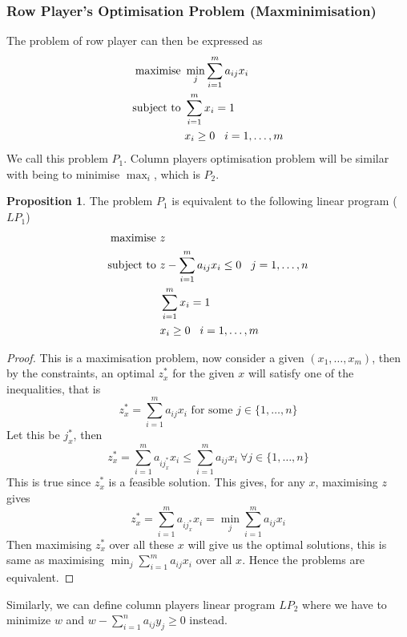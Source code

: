 \documentclass{article}
\theoremstyle{definition}
\newtheorem{prop}{Proposition}[section]
\begin{document}
\subsubsection*{Row Player's Optimisation Problem (Maxminimisation)}
The problem of row player can then be expressed as
\begin{align*}
\text{maximise } & \min_j \sum_{i=1}^m a_{ij}x_i\\
\text{subject to } & \sum_{i=1}^m x_i = 1\\
& x_i\geq 0 \hspace{3mm} i = 1,\dots,m
\end{align*}
We call this problem $P_1$. Column players optimisation problem will be similar with being to minimise $\max_i$, which is $P_2$.
\begin{prop}
The problem $P_1$ is equivalent to the following linear program ($LP_1$)
\begin{align*}
\text{maximise } & z\\
\text{subject to } & z - \sum_{i=1}^m a_{ij}x_i\leq 0 \hspace{3mm} j = 1,\dots,n\\
& \sum_{i=1}^m x_i = 1\\
& x_i\geq 0 \hspace{3mm} i = 1,\dots,m
\end{align*}
\end{prop}
\begin{proof}
This is a maximisation problem, now consider a given $(x_1,\dots,x_m)$, then by the constraints, an optimal $z_x^*$ for the given $x$ will satisfy one of the inequalities, that is $$z^*_x = \sum_{i=1}^m a_{ij}x_i \text{ for some } j\in\{1,\dots,n\}$$ Let this be $j^*_x$, then $$z^*_x = \sum_{i=1}^m a_{ij^*_x} x_i \leq \sum_{i=1}^m a_{ij}x_i ~\forall j\in \{1,\dots,n\}$$ This is true since $z^*_x$ is a feasible solution. This gives, for any $x$, maximising $z$ gives $$z^*_x = \sum_{i=1}^m a_{ij^*_x} x_i = \min_j \sum_{i=1}^m a_{ij}x_i$$ Then maximising $z^*_x$ over all these $x$ will give us the optimal solutions, this is same as maximising $\min_j \sum_{i=1}^m a_{ij}x_i$ over all $x$. Hence the problems are equivalent.
\end{proof}
Similarly, we can define column players linear program $LP_2$ where we have to minimize $w$ and $w - \sum_{i=1}^n a_{ij}y_j\geq 0$ instead.
\end{document}
